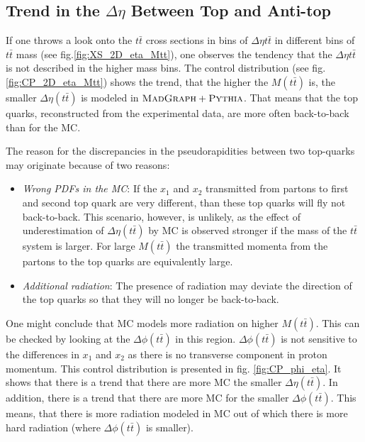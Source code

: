\subsection{Trend in the $\Delta\eta$ Between Top and Anti-top} \label{sec:deta_discuss}

If one throws a look onto the $t\bar{t}$ cross sections in bins of $\Delta\eta{t\bar{t}}$ in different bins of $t\bar{t}$ mass
(see fig.\ref{fig:XS_2D_eta_Mtt}), one observes the tendency that the $\Delta\eta{t\bar{t}}$ is not described in the higher mass bins.
The control distribution (see fig. \ref{fig:CP_2D_eta_Mtt}) shows the trend, that the higher the $M(t\bar{t})$ is, the smaller $\Delta\eta(t\bar{t})$
is modeled in $\textsc{MadGraph}+\textsc{Pythia}$. That means that the top quarks, reconstructed from the experimental data, are more often back-to-back 
than for the MC.

The reason for the discrepancies in the pseudorapidities between two top-quarks may originate because of two reasons:

\begin{itemize}
 \item \textit{Wrong PDFs in the MC}: If the $x_{1}$ and $x_{2}$ transmitted from partons to first and second top quark are very different, than these
 top quarks will fly not back-to-back. This scenario, however, is unlikely, as the effect of underestimation of $\Delta\eta(t\bar{t})$
 by MC is observed stronger if the mass of the $t\bar{t}$ system is larger. For large $M(t\bar{t})$ the transmitted momenta from the partons
 to the top quarks are equivalently large.
 
 \item \textit{Additional radiation}: The presence of radiation may deviate the direction of the top quarks so that they will no longer be back-to-back.
\end{itemize}

One might conclude that MC models more radiation on higher $M(t\bar{t})$. This can be checked by looking at the $\Delta\phi(t\bar{t})$ in this region.
$\Delta\phi(t\bar{t})$ is not sensitive to the differences in $x_{1}$ and $x_{2}$ as there is no transverse component in proton momentum.
This control distribution is presented in fig. \ref{fig:CP_phi_eta}. It shows that there is a trend that there are more MC the smaller $\Delta\eta(t\bar{t})$.
In addition, there is a trend that there are more MC for the smaller $\Delta\phi(t\bar{t})$. This means, that there is more radiation modeled
in MC out of which there is more hard radiation (where $\Delta\phi(t\bar{t})$ is smaller).

